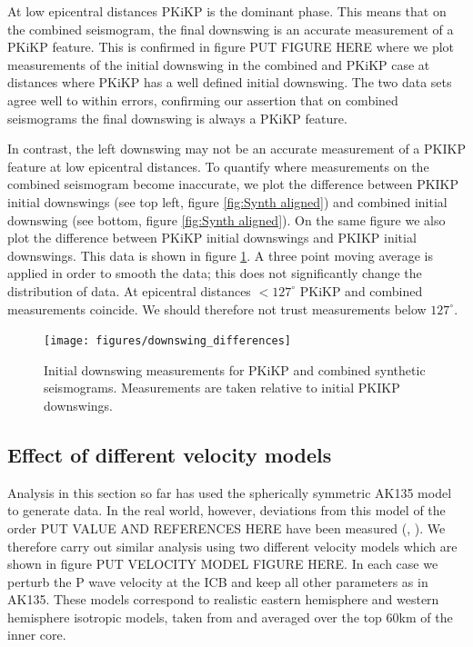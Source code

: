 \documentclass[11pt,a4paper]{article}
\begin{document}
At low epicentral distances PKiKP is the dominant phase. This means that on the combined seismogram, the final downswing is an accurate measurement of a PKiKP feature. This is confirmed in figure PUT FIGURE HERE where we plot measurements of the initial downswing in the combined and PKiKP case at distances where PKiKP has a well defined initial downswing. The two data sets agree well to within errors, confirming our assertion that on combined seismograms the final downswing is always a PKiKP feature.

In contrast, the left downswing may not be an accurate measurement of a PKIKP feature at low epicentral distances. To quantify where measurements on the combined seismogram become inaccurate, we plot the difference between PKIKP initial downswings (see top left, figure \ref{fig:Synth aligned}) and combined initial downswing (see bottom, figure \ref{fig:Synth aligned}). On the same figure we also plot the difference between PKiKP initial downswings and PKIKP initial downswings. This data is shown in figure \ref{fig:Downswing differences}. A three point moving average is applied in order to smooth the data; this does not significantly change the distribution of data. At epicentral distances $< 127^{\circ}$ PKiKP and combined measurements coincide. We should therefore not trust measurements below $127^{\circ}$.

\begin{figure}
	\centering
	\texttt{[image: figures/downswing\_differences]}
	\caption{Initial downswing measurements for PKiKP and combined synthetic seismograms. Measurements are taken relative to initial PKIKP downswings.}
	\label{fig:Downswing differences}
\end{figure}

\subsection{Effect of different velocity models}
Analysis in this section so far has used the spherically symmetric AK135 model to generate data. In the real world, however, deviations from this model of the order PUT VALUE AND REFERENCES HERE have been measured (\cite{Waszek2011a}, \cite{Yee2014}). We therefore carry out similar analysis using two different velocity models which are shown in figure PUT VELOCITY MODEL FIGURE HERE. In each case we perturb the P wave velocity at the ICB and keep all other parameters as in AK135. These models correspond to realistic eastern hemisphere and western hemisphere isotropic models, taken from \cite{Waszek2011a} and averaged over the top 60km of the inner core.
\end{document}
